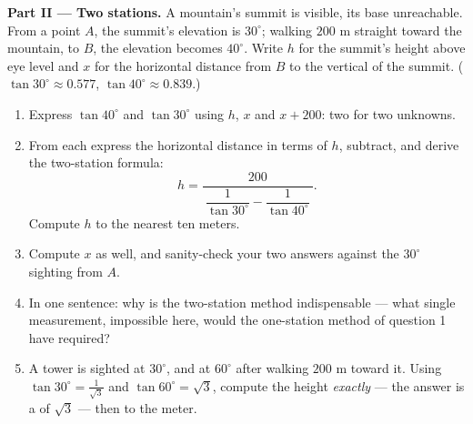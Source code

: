 \begin{problem}
\medskip
\noindent\textbf{Part II --- Two stations.}
A mountain's summit is visible, its base unreachable. From a
point $A$, the summit's elevation is $30^\circ$; walking $200$ m
straight toward the mountain, to $B$, the elevation becomes
$40^\circ$. Write $h$ for the summit's height above eye level
and $x$ for the horizontal distance from $B$ to the vertical of
the summit. ($\tan 30^\circ \approx 0.577$,
$\tan 40^\circ \approx 0.839$.)
\begin{enumerate}[resume]
  \item Express $\tan 40^\circ$ and $\tan 30^\circ$ using $h$,
        $x$ and $x + 200$: two  for two unknowns.
  \item From each  express the horizontal distance in
        terms of $h$, subtract, and derive the two-station
        formula:
        \[
        h = \frac{200}
        {\ \dfrac{1}{\tan 30^\circ} - \dfrac{1}{\tan 40^\circ}\ } .
        \]
        Compute $h$ to the nearest ten meters.
  \item Compute $x$ as well, and sanity-check your two answers
        against the $30^\circ$ sighting from $A$.
  \item In one sentence: why is the two-station method
        indispensable --- what single measurement, impossible
        here, would the one-station method of question 1 have
        required?
  \item A tower is sighted at $30^\circ$, and at $60^\circ$
        after walking $200$ m toward it. Using
        $\tan 30^\circ = \frac{1}{\sqrt3}$ and
        $\tan 60^\circ = \sqrt3$, compute the height
        \emph{exactly} --- the answer is a  of
        $\sqrt3$ --- then to the meter.
\end{enumerate}


\end{problem}
